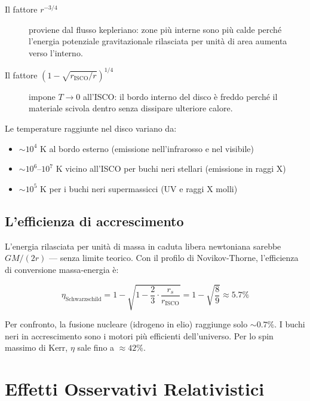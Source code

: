 \documentclass[12pt, a4paper, twoside]{article}
\theoremstyle{definition}
\newcommand{\RS}{r_{\!s}}          %
\newcommand{\Risco}{r_{\!\text{ISCO}}} %
\begin{document}
\begin{description}
  \item[Il fattore $r^{-3/4}$] proviene dal flusso kepleriano: zone più interne
    sono più calde perché l'energia potenziale gravitazionale rilasciata per
    unità di area aumenta verso l'interno.
  \item[Il fattore $(1 - \sqrt{\Risco/r})^{1/4}$] impone $T \to 0$ all'ISCO:
    il bordo interno del disco è freddo perché il materiale scivola dentro
    senza dissipare ulteriore calore.
\end{description}

Le temperature raggiunte nel disco variano da:
\begin{itemize}
  \item $\sim 10^4$ K al bordo esterno (emissione nell'infrarosso e nel visibile)
  \item $\sim 10^6$–$10^7$ K vicino all'ISCO per buchi neri stellari (emissione in raggi X)
  \item $\sim 10^5$ K per i buchi neri supermassicci (UV e raggi X molli)
\end{itemize}

\subsection{L'efficienza di accrescimento}

L'energia rilasciata per unità di massa in caduta libera newtoniana sarebbe
$GM/(2r)$ — senza limite teorico. Con il profilo di Novikov-Thorne, l'efficienza
di conversione massa-energia è:

\begin{equation}
  \eta_{\text{Schwarzschild}} = 1 - \sqrt{1 - \frac{2}{3}\cdot\frac{\RS}{\Risco}}
  = 1 - \sqrt{\frac{8}{9}} \approx 5.7\%
\end{equation}

Per confronto, la fusione nucleare (idrogeno in elio) raggiunge solo $\sim 0.7\%$.
I buchi neri in accrescimento sono i motori più efficienti dell'universo.
Per lo spin massimo di Kerr, $\eta$ sale fino a $\approx 42\%$.

\newpage

\section{Effetti Osservativi Relativistici}
\end{document}
